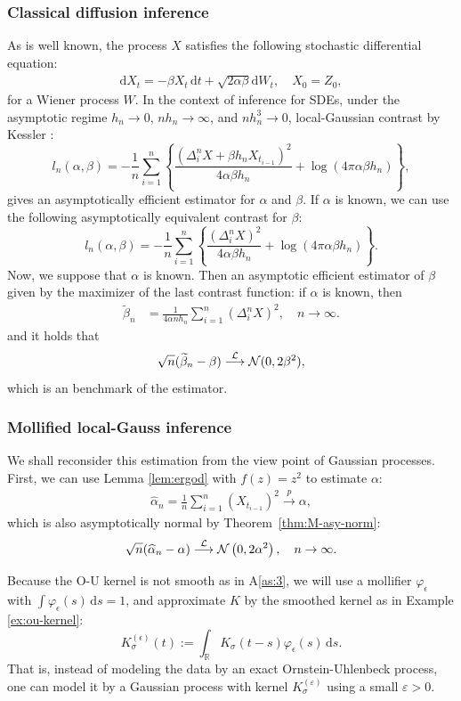 \documentclass[a4paper,10pt,twoside]{article}
\numberwithin{equation}{section}
\def\e{{\epsilon}}
\def\l{\left}
\def\r{\right}
\def\a{\alpha}
\def\b{\beta}
\def\toP{\stackrel{p}{\longrightarrow}}
\def\toD{\stackrel{{\cal L}}{\longrightarrow}}
\def\wh#1{\widehat{#1}}
\def\df{\mathrm{d}}
\begin{document}
\subsubsection{Classical diffusion inference}
As is well known, the process $X$ satisfies the following stochastic differential equation: 
\begin{align*}
 \df X_t = -\b X_t\,\df t + \sqrt{2\a\b}\df W_t,  \quad X_0=Z_0,  %
\end{align*}
for a Wiener process $W$. In the context of inference for SDEs, under the asymptotic regime $h_n \to 0$, $n h_n \to \infty$, and $n h_n^3 \to 0$, local-Gaussian contrast by Kessler \cite{k97}: 
\[
l_n(\alpha, \beta) = - \frac{1}{n} \sum_{i=1}^n \l\{
\frac{(\Delta_i^n X + \beta h_n  X_{t_{i-1}})^2}{4\alpha \beta h_n} + \log(4\pi \alpha \beta h_n)
\r\}, 
\]
gives an asymptotically efficient estimator for $\alpha$ and $\beta$. 
If $\alpha$ is known, we can use the following asymptotically equivalent contrast for $\beta$: 
\[
l_n(\alpha, \beta) = - \frac{1}{n} \sum_{i=1}^n \l\{
\frac{(\Delta_i^n X )^2}{4\alpha \beta h_n} + \log(4\pi \alpha \beta h_n) 
\r\}. 
\]
Now, we suppose that $\a$ is known. Then an asymptotic efficient estimator of $\b$ given by the maximizer of the last contrast function: 
if $\a$ is known, then 
\begin{align}
\widetilde{\b}_n &= \frac{1}{4 \a nh_n} \sum_{i=1}^n (\Delta_i^n X)^2,\quad n\to \infty. 
\label{est-sde}
\end{align}
and it holds that
\[
\sqrt{n} (\widetilde{\b}_n - \b) \toD \mathcal{N}(0, 2\b^{2}), 
\]
which is an benchmark of the estimator. 


\subsubsection{Mollified local-Gauss inference}

We shall reconsider this estimation from the view point of Gaussian processes. 
First, we can use Lemma \ref{lem:ergod} with $f(z)=z^2$ to estimate $\a$: 
\begin{align*}
\wh{\a}_n = \frac{1}{n}\sum_{i=1}^n (X_{t_{i-1}})^2\toP \a, %
\end{align*}
which is also asymptotically normal by Theorem~\ref{thm:M-asy-norm}: 
\[
\sqrt{n}(\wh{\a}_n- \a) \toD {\cal N}\l(0,2\a^2\r),\quad n\to \infty. 
\]


Because the O-U kernel is not smooth as in A\ref{as:3}, we will use a mollifier $\varphi_\e$ with $\int \varphi_\e(s)\,\mathrm{d}s = 1$, and approximate $K$ by the smoothed kernel as in Example \ref{ex:ou-kernel}: 
\[
K_\sigma^{(\e)}(t) := \int_{\mathbb{R}} K_\sigma(t - s) \varphi_\e(s) \, \mathrm{d}s.
\]
That is, instead of modeling the data by an exact Ornstein-Uhlenbeck process, one can model it by a Gaussian process with kernel $K_\sigma^{(\varepsilon)}$ using a small $\varepsilon > 0$. 
\end{document}
